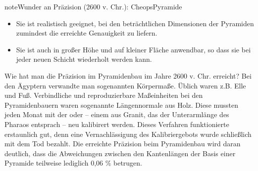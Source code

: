 \documentclass[letterpaper,10pt,english]{jupyterBook}
\begin{document}
\begin{sphinxadmonition}{note}{Wunder an Präzision (2600 v. Chr.): Cheops\sphinxhyphen{}Pyramide}
\begin{itemize}
\item {} 
\sphinxAtStartPar
Sie ist realistisch geeignet, bei den beträchtlichen Dimensionen der Pyramiden zumindest die erreichte Genauigkeit zu liefern.

\item {} 
\sphinxAtStartPar
Sie ist auch in großer Höhe und auf kleiner Fläche anwendbar, so dass sie bei jeder neuen Schicht wiederholt werden kann.

\end{itemize}
\end{sphinxadmonition}

\sphinxAtStartPar
Wie hat man die Präzision im Pyramidenbau im Jahre 2600 v. Chr. erreicht? Bei den Ägyptern verwandte man sogenannten Körpermaße. Üblich waren z.B. Elle und Fuß. Verbindliche und reproduzierbare Maßeinheiten bei den Pyramidenbauern waren sogenannte Längennormale aus Holz. Diese  mussten jeden Monat mit der  oder  – einem  aus Granit, das der Unterarmlänge des Pharaos entsprach – neu kalibirert werden.
Dieses Verfahren funktionierte erstaunlich gut, denn eine Vernachlässigung des Kalibriergebots wurde schließlich mit dem Tod bezahlt.
Die erreichte Präzision beim Pyramidenbau wird daran deutlich, dass die Abweichungen zwischen den Kantenlängen der Basis einer Pyramide teilweise lediglich 0,06 \% betrugen.
\end{document}
